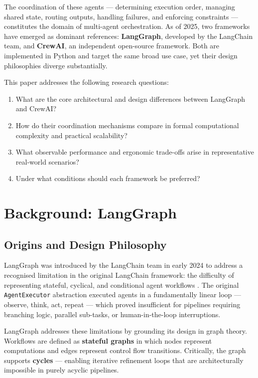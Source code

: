\documentclass[12pt,a4paper]{article}
\begin{document}
The coordination of these agents --- determining execution order, managing
shared state, routing outputs, handling failures, and enforcing constraints ---
constitutes the domain of multi-agent orchestration. As of 2025, two frameworks
have emerged as dominant references: \textbf{LangGraph}, developed by the
LangChain team, and \textbf{CrewAI}, an independent open-source framework.
Both are implemented in Python and target the same broad use case, yet their
design philosophies diverge substantially.

This paper addresses the following research questions:
\begin{enumerate}
    \item What are the core architectural and design differences between
          LangGraph and CrewAI?
    \item How do their coordination mechanisms compare in formal computational
          complexity and practical scalability?
    \item What observable performance and ergonomic trade-offs arise in
          representative real-world scenarios?
    \item Under what conditions should each framework be preferred?
\end{enumerate}

\section{Background: LangGraph}

\subsection{Origins and Design Philosophy}

LangGraph was introduced by the LangChain team in early 2024 to address a
recognised limitation in the original LangChain framework: the difficulty of
representing stateful, cyclical, and conditional agent workflows
\cite{Smith2023LangGraph}. The original \texttt{AgentExecutor} abstraction
executed agents in a fundamentally linear loop --- observe, think, act, repeat
--- which proved insufficient for pipelines requiring branching logic, parallel
sub-tasks, or human-in-the-loop interruptions.

LangGraph addresses these limitations by grounding its design in graph theory.
Workflows are defined as \textbf{stateful graphs} in which nodes represent
computations and edges represent control flow transitions. Critically, the graph
supports \textbf{cycles} --- enabling iterative refinement loops that are
architecturally impossible in purely acyclic pipelines.
\end{document}
